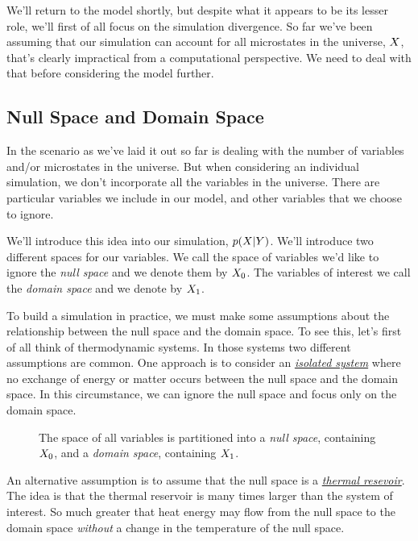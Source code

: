 \documentclass[]{article}
\begin{document}
We'll return to the model shortly, but despite what it appears to be its lesser role, we'll first of all focus on the simulation divergence. So far we've been assuming that our simulation can account for all microstates in the universe, $X$, that's clearly impractical from a computational perspective. We need to deal with that before considering the model further.

\subsection{Null Space and Domain Space}

In the scenario as we've laid it out so far is dealing with the number of variables and/or microstates in the universe. But when considering an individual simulation, we don't incorporate all the variables in the universe. There are particular variables we include in our model, and other variables that we choose to ignore. 

We'll introduce this idea into our simulation, $p(X |Y)$. We'll introduce two different spaces for our variables. We call the space of variables we'd like to ignore the \emph{null space} and we denote them by $X_0$. The variables of interest we call the \emph{domain space} and we denote by $X_1$.

To build a simulation in practice, we must make some assumptions about the relationship between the null space and the domain space. To see this, let's first of all think of thermodynamic systems. In those systems two different assumptions are common. One approach is to consider an 
\href{https://en.wikipedia.org/wiki/Isolated_system}{\emph{isolated
system}} where no exchange of energy or matter occurs between the null
space and the domain space. In this circumstance, we can ignore the null space and focus only on the domain space. 

\begin{figure}
\caption{The space of all variables is partitioned into a \emph{null space}, containing $X_0$, and a \emph{domain space}, containing $X_1$.}
\end{figure}

An alternative assumption is to assume that the null
space is a \href{https://en.wikipedia.org/wiki/Thermal_reservoir}{\emph{thermal
resevoir}}.  The idea is that the thermal reservoir is many times larger than the system of interest. So much greater that heat energy may flow from the null space to the domain
space \emph{without} a change in the temperature of the null space.
\end{document}
